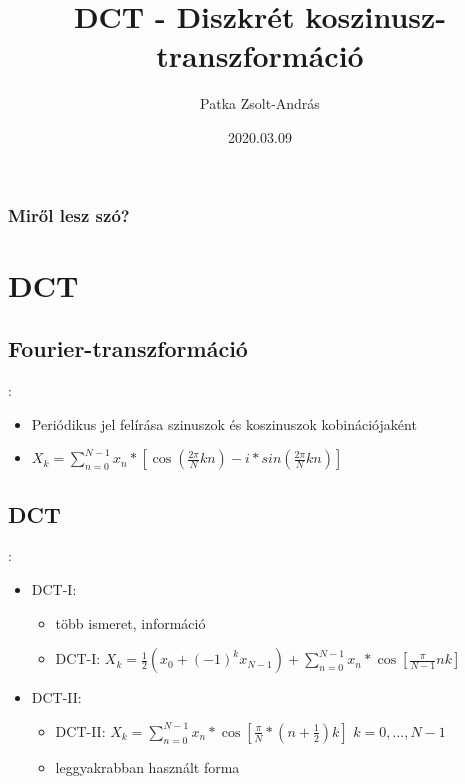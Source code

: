 \documentclass{beamer}
\title{DCT - Diszkrét koszinusz-transzformáció}
\author{Patka Zsolt-András}
\institute{Sapientia EMTE - Számítástechnika IV}
\date{2020.03.09}
\begin{document}
\begin{frame}
    \titlepage
\end{frame}

\begin{frame}
\frametitle{Miről lesz szó?}
\tableofcontents
\end{frame}

\section{DCT}

\subsection{Fourier-transzformáció}
\begin{frame}{\secname : \subsecname}
    \begin{itemize}
        \item Periódikus jel felírása szinuszok és koszinuszok kobinációjaként
        \item $ X_k = \sum_{n=0}^{N - 1} x_n * [\cos(\frac{2 \pi}{N} kn) - i * sin(\frac{2\pi}{N} kn)]$
    \end{itemize}
\end{frame}

\subsection{DCT}
\begin{frame}{\secname : \subsecname}
    \begin{itemize}
        \item DCT-I:
        \begin{itemize}
            \item több ismeret, információ
            \item DCT-I: $ X_k = \frac{1}{2} (x_0 + (-1)^kx_{N-1}) + \sum_{n=0}^{N - 1} x_n * \cos[\frac{\pi}{N - 1} nk]$
        \end{itemize}
        \item DCT-II:
        \begin{itemize}
            \item DCT-II: $ X_k = \sum_{n=0}^{N - 1} x_n * \cos[\frac{\pi}{N} * (n + \frac{1}{2})k] $ $k=0,...,N-1$
            \item leggyakrabban használt forma
        \end{itemize}
    \end{itemize}
    
\end{frame}
\end{document}
